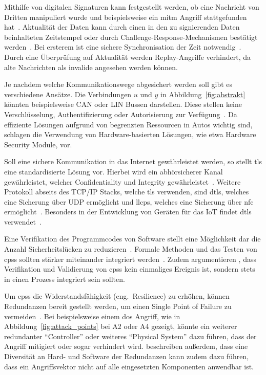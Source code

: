 \documentclass[final,bibliography=totocnumbered]{include/sikseminar}
\newcommand{\cps}{\glspl{cps}\xspace}
\begin{document}
Mithilfe von digitalen Signaturen kann festgestellt werden, ob eine Nachricht von Dritten manipuliert wurde und beispielsweise ein \gls{mitm} Angriff stattgefunden hat~\cite{CAS08}.
Aktualität der Daten kann durch einen in den zu signierenden Daten beinhalteten Zeitstempel oder durch Challenge-Response-Mechanismen bestätigt werden~\cite{CAS08}.
Bei ersterem ist eine sichere Synchronisation der Zeit notwendig~\cite{CAS08}.
Durch eine Überprüfung auf Aktualität werden Replay-Angriffe verhindert, da alte Nachrichten als invalide angesehen werden können.


Je nachdem welche Kommunikationswege abgesichert werden soll gibt es verschiedene Ansätze.
Die Verbindungen $u$ und $y$ in Abbildung~\ref{fig:abstrakt} könnten beispielsweise CAN oder LIN Bussen darstellen.
Diese stellen keine Verschlüsselung, Authentifizierung oder Autorisierung zur Verfügung~\cite{HLL+17}.
Da effiziente Lösungen aufgrund von begrenzten Ressourcen in Autos wichtig sind, schlagen \citeauthor{HLL 167,41} die Verwendung von Hardware-basierten Lösungen, wie etwa Hardware Security Module, vor.


Soll eine sichere Kommunikation in das Internet gewährleistet werden, so stellt \gls{tls} eine standardisierte Lösung vor.
Hierbei wird ein abhörsicherer Kanal gewährleistet, welcher Confidentiality und Integrity gewährleistet~\cite{SPB+16}.
Weitere Protokoll abseits des TCP/IP Stacks, welche \gls{tls} verwenden, sind \gls{dtls}, welches eine Sicherung über UDP ermöglicht und \gls{llcps}, welches eine Sicherung über \gls{nfc} ermöglicht~\cite{SPB+16}.
Besonders in der Entwicklung von Geräten für das IoT findet \gls{dtls} verwendet~\cite{YWY+17,FPA+18}.


Eine Verifikation des Programmcodes von Software stellt eine Möglichkeit dar die Anzahl Sicherheitslücken zu reduzieren~\cite{CAS08}.
Formale Methoden und das Testen von \cps sollten stärker miteinander integriert werden~\cite{RLS+10}.
Zudem argumentieren \citeauthor{SGL+08}, dass Verifikation und Validierung von \cps kein einmaliges Ereignis ist, sondern stets in einen Prozess integriert sein sollten.


Um \cps die Widerstandsfähigkeit (eng.\ Resilience) zu erhöhen, können Redundanzen bereit gestellt werden, um einen Single Point of Failure zu vermeiden~\cite{CAS+09}.
Bei beispielsweise einem \gls{dos} Angriff, wie in Abbildung~\ref{fig:attack_points} bei A2 oder A4 gezeigt, könnte ein weiterer redundanter \enquote{Controller} oder weiteres \enquote{Physical System} dazu führen, dass der Angriff mitigiert oder sogar verhindert wird.
\citeauthor{CAS+09} beschreiben außerdem, dass eine Diversität an Hard- und Software der Redundanzen kann zudem dazu führen, dass ein Angriffsvektor nicht auf alle eingesetzten Komponenten anwendbar ist.
\end{document}
